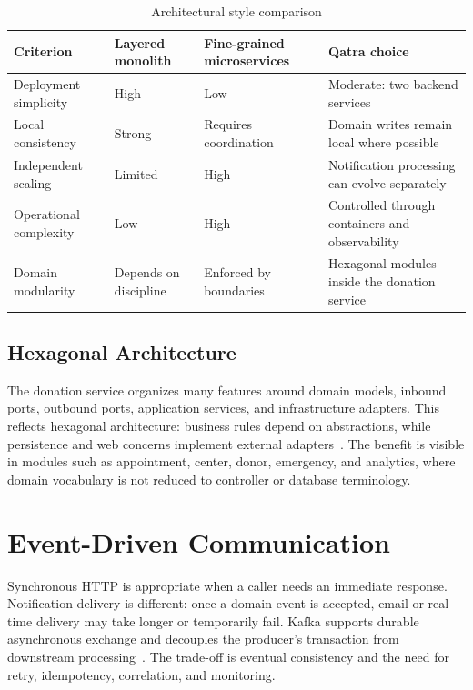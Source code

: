 \begin{table}[H]
\centering\small
\begin{tabularx}{\textwidth}{|P{3.2cm}|Y|Y|Y|}
\hline
{}\textbf{Criterion} & \textbf{Layered monolith} & \textbf{Fine-grained microservices} & \textbf{Qatra choice}\\ \hline
Deployment simplicity & High & Low & Moderate: two backend services\\ \hline
Local consistency & Strong & Requires coordination & Domain writes remain local where possible\\ \hline
Independent scaling & Limited & High & Notification processing can evolve separately\\ \hline
Operational complexity & Low & High & Controlled through containers and observability\\ \hline
Domain modularity & Depends on discipline & Enforced by boundaries & Hexagonal modules inside the donation service\\ \hline
\end{tabularx}
\caption{Architectural style comparison}
\label{tab:architecture-comparison}
\end{table}

\subsection{Hexagonal Architecture}
The donation service organizes many features around domain models, inbound ports, outbound ports, application services, and infrastructure adapters. This reflects hexagonal architecture: business rules depend on abstractions, while persistence and web concerns implement external adapters~\cite{hexagonal}. The benefit is visible in modules such as appointment, center, donor, emergency, and analytics, where domain vocabulary is not reduced to controller or database terminology.

\section{Event-Driven Communication}
Synchronous HTTP is appropriate when a caller needs an immediate response. Notification delivery is different: once a domain event is accepted, email or real-time delivery may take longer or temporarily fail. Kafka supports durable asynchronous exchange and decouples the producer's transaction from downstream processing~\cite{kafka}. The trade-off is eventual consistency and the need for retry, idempotency, correlation, and monitoring.

